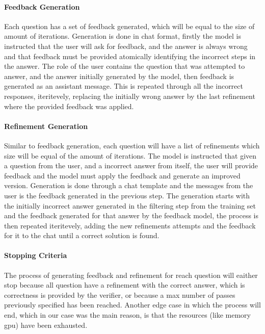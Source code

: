 \documentclass[a4paper,10pt]{article}
\begin{document}
\paragraph{Feedback Generation}
Each question has a set of feedback generated, which will be equal to the size of amount of iterations. Generation is done in chat format, firstly the model is instructed that the user will ask for feedback, and the answer is always wrong and that feedback must  be provided atomically identifying the incorrect steps in the answer. The role of the user contains the question that was attempted to answer, and the answer initially generated by the model, then feedback is generated as an assistant message. This is repeated through all the incorrect responses, iteritevely, replacing the initially wrong answer by the last refinement where the provided feedback was applied.
\paragraph{Refinement Generation}
Similar to feedback generation, each question will have a list of refinements which size will be equal of the amount of iterations. The model is instructed that given a question from the user, and a incorrect answer from itself, the user will provide feedback and the model must apply the feedback and generate an improved version. Generation is done through a chat template and the messages from the user is the feedback generated in the previous step. The generation starts with the initially incorrect answer generated in the filtering step from the training set and the feedback generated for that answer by the feedback model, the process is then repeated iteritevely, adding the new refinements  attempts and the feedback for it to the chat until a correct solution is found.
\paragraph{Stopping Criteria}
The process of generating feedback and refinement for reach question will eaither stop because all question have a refinement with the correct answer, which is correctness is provided by the verifier, or because a max number of passes previously specified has been reached. Another edge case in which the process will end, which in our case was the main reason, is that the resources (like memory gpu) have been exhausted.
\end{document}
